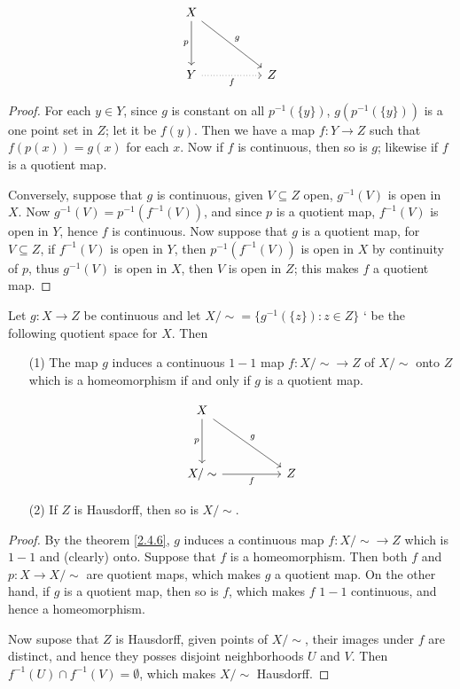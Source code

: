 \[\begin{tikzcd}
	X \\
	\\
	Y && Z
	\arrow["g", from=1-1, to=3-3]
	\arrow["f"', dotted, from=3-1, to=3-3]
	\arrow["p"', from=1-1, to=3-1]
\end{tikzcd}\]

\begin{proof}
    For each $y \in Y$, since  $g$ is constant on all  $p^{-1}(\{y\})$,
    $g(p^{-1}(\{y\}))$ is a one
    point set in $Z$; let it be $f(y)$. Then we have a map $f:Y \rightarrow Z$ such that
    $f(p(x))=g(x)$ for each $x$. Now if  $f$ is continuous, then so is  $g$; likewise if  $f$ is a
    quotient map.

    Conversely, suppose that  $g$ is continuous, given  $V \subseteq Z$ open,  $g^{-1}(V)$ is open
    in $X$. Now  $g^{-1}(V)=p^{-1}(f^{-1}(V))$, and since $p$ is a quotient map,  $f^{-1}(V)$ is
    open in $Y$, hence  $f$ is continuous. Now suppose that  $g$ is a quotient map, for  $V
    \subseteq Z$, if  $f^{-1}(V)$ is open in $Y$, then  $p^{-1}(f^{-1}(V))$ is open in $X$ by
    continuity of  $p$, thus  $g^{-1}(V)$ is open in $X$, then  $V$ is open in  $Z$; this makes  $f$
    a quotient map.
\end{proof}
\begin{corollary}
    Let $g:X \rightarrow Z$ be continuous and let $X/\sim=\{g^{-1}(\{z\}):z \in Z\}$ ` be the
    following quotient space for $X$. Then
        \begin{enumerate}
            \item[(1)] The map $g$ induces a continuous  $1-1$ map  $f:X/\sim \rightarrow Z$ of  $X/\sim$
                onto  $Z$ which is a homeomorphism if and only if $g$ is a quotient map.

                \[\begin{tikzcd}
	                X \\
	                \\
	                {X/\sim} && Z
	                \arrow["p"', from=1-1, to=3-1]
	                \arrow["f"', from=3-1, to=3-3]
	                \arrow["g", from=1-1, to=3-3]
                    \end{tikzcd}\]

            \item[(2)] If $Z$ is Hausdorff, then so is  $X/\sim$.
        \end{enumerate}
\end{corollary}
\begin{proof}
    By the theorem \ref{2.4.6}, $g$ induces a continuous map  $f:X/\sim \rightarrow Z$ which is
    $1-1$ and  (clearly) onto. Suppose that $f$ is a homeomorphism. Then both  $f$ and  $p:X
    \rightarrow X/\sim$ are quotient maps, which makes  $g$ a quotient map. On the other hand, if
    $g$ is a quotient map, then so is  $f$, which makes  $f$  $1-1$ continuous, and hence a
    homeomorphism.

    Now supose that  $Z$ is Hausdorff, given points of  $X/\sim$, their images under  $f$ are
    distinct, and hence they posses disjoint neighborhoods  $U$ and  $V$. Then  $f^{-1}(U) \cap
    f^{-1}(V)=\emptyset$, which makes $X/\sim$ Hausdorff.
\end{proof}

